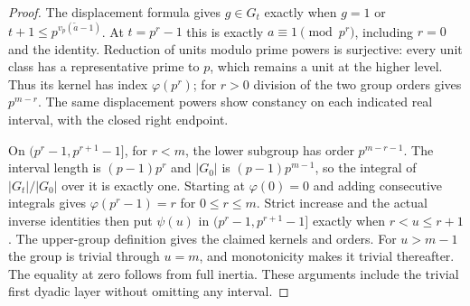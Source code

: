 \begin{proof}
The displacement formula gives $g\in G_t$ exactly when $g=1$
or $t+1\leq p^{v_p(\widetilde a-1)}$. At $t=p^r-1$ this is
exactly $a\equiv1\pmod{p^r}$, including $r=0$ and the identity.
Reduction of units modulo prime powers is surjective: every unit
class has a representative prime to $p$, which remains a unit
at the higher level. Thus its kernel has index $\varphi(p^r)$;
for $r>0$ division of the two group orders gives $p^{m-r}$.
The same displacement powers show constancy on each indicated
real interval, with the closed right endpoint.

On $(p^r-1,p^{r+1}-1]$, for $r<m$, the lower subgroup has order
$p^{m-r-1}$. The interval length is $(p-1)p^r$ and $|G_0|$ is
$(p-1)p^{m-1}$, so the integral of $|G_t|/|G_0|$ over it is
exactly one. Starting at $\varphi(0)=0$ and adding consecutive
integrals gives $\varphi(p^r-1)=r$ for $0\leq r\leq m$.
Strict increase and the actual inverse identities then put
$\psi(u)$ in $(p^r-1,p^{r+1}-1]$ exactly when $r<u\leq r+1$.
The upper-group definition gives the claimed kernels and orders.
For $u>m-1$ the group is trivial through $u=m$, and monotonicity
makes it trivial thereafter. The equality at zero follows from
full inertia. These arguments include the trivial first dyadic
layer without omitting any interval.
\end{proof}

